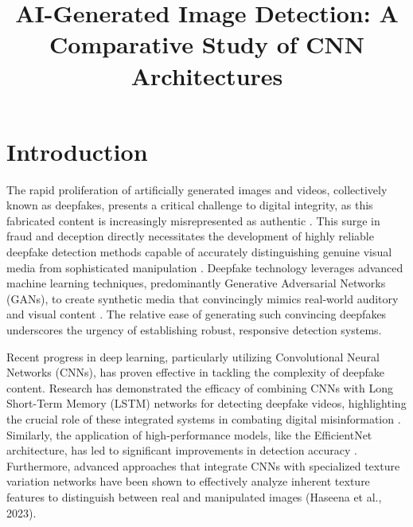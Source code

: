 \documentclass[man,12pt,letterpaper,donotrepeattitle,floatsintext]{apa7}
\title{AI-Generated Image Detection: A Comparative Study of CNN Architectures}
\begin{document}
\maketitle

\thispagestyle{empty}
\newpage

\section{Introduction}
The rapid proliferation of artificially generated images and videos, 
collectively known as deepfakes, presents a critical challenge to digital integrity, 
as this fabricated content is increasingly misrepresented as authentic 
\citep{Kingsley2024, Maharjan2023}. This surge in fraud and deception directly
necessitates the development of highly reliable deepfake detection methods capable 
of accurately distinguishing genuine visual media from sophisticated manipulation 
\citep{ST2022}. Deepfake technology leverages advanced machine learning techniques, 
predominantly Generative Adversarial Networks (GANs), to create synthetic media 
that convincingly mimics real-world auditory and visual content 
\citep{Kingsley2024, Maharjan2023}. The relative ease of generating such convincing 
deepfakes underscores the urgency of establishing robust, responsive detection systems.

Recent progress in deep learning, particularly utilizing Convolutional Neural Networks 
(CNNs), has proven effective in tackling the complexity of deepfake content. 
Research has demonstrated the efficacy of combining CNNs with Long Short-Term Memory 
(LSTM) networks for detecting deepfake videos, highlighting the crucial role of these 
integrated systems in combating digital misinformation \citep{Abidin2022, Gawali2024}. 
Similarly, the application of high-performance models, like the EfficientNet architecture, 
has led to significant improvements in detection accuracy \citep{Sowmya2024}. 
Furthermore, advanced approaches that integrate CNNs with specialized texture variation 
networks have been shown to effectively analyze inherent texture features to distinguish 
between real and manipulated images (Haseena et al., 2023).
\end{document}
